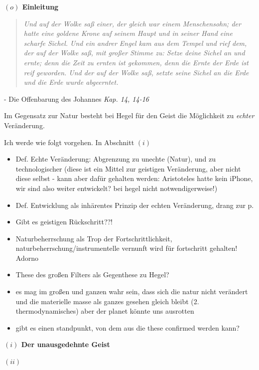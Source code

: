 \documentclass[a4paper, 12pt]{article}
\newcommand{\chapquote}[3]{\begin{quotation} \textit{#1} \small \end{quotation} \begin{flushright} - #2 \textit{#3}\end{flushright} }
\begin{document}
\begin{onehalfspace} 


\noindent\textbf{$(o)$ Einleitung}
\chapquote{Und auf der Wolke saß einer, der gleich war einem Menschensohn; der hatte eine goldene Krone auf seinem Haupt und in seiner Hand eine scharfe Sichel. Und ein andrer Engel kam aus dem Tempel und rief dem, der auf der Wolke saß, mit großer Stimme zu: Setze deine Sichel an und ernte; denn die Zeit zu ernten ist gekommen, denn die Ernte der Erde ist reif geworden. Und der auf der Wolke saß, setzte seine Sichel an die Erde und die Erde wurde abgeerntet.}{Die Offenbarung des Johannes}{Kap. 14, 14-16}

\noindent Im Gegensatz zur Natur besteht bei Hegel für den Geist die Möglichkeit zu \emph{echter} Veränderung.

\vspace{3mm}

Ich werde wie folgt vorgehen. In Abschnitt $(i)$ 

\begin{itemize}
  \item Def. Echte Veränderung: Abgrenzung zu unechte (Natur), und zu technologischer (diese ist ein Mittel zur geistigen Veränderung, aber nicht diese selbst - kann aber dafür gehalten werden: Aristoteles hatte kein iPhone, wir sind also weiter entwickelt? bei hegel nicht notwendigerweise!)
  \item Def. Entwicklung als inhärentes Prinzip der echten Veränderung, drang zur p.
  \item Gibt es geistigen Rückschritt??!
  \item Naturbeherrschung als Trop der Fortschrittlichkeit, naturbeherrschung/instrumentelle vernunft wird für fortschritt gehalten! Adorno
  \item These des großen Filters als Gegenthese zu Hegel? 
  \item es mag im großen und ganzen wahr sein, dass sich die natur nicht verändert und die materielle masse als ganzes gesehen gleich bleibt (2. thermodynamisches) aber der planet könnte uns ausrotten
  \item gibt es einen standpunkt, von dem aus die these confirmed werden kann?
\end{itemize}


\vspace{5mm}
\noindent\textbf{$(i)$ Der unausgedehnte Geist}


\noindent 






\vspace{5mm}
\noindent\textbf{$(ii)$ }


\end{onehalfspace}
\printbibliography
\end{document}
